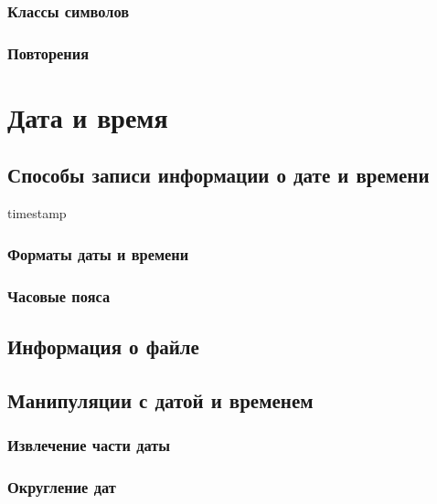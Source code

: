 \documentclass[
  letterpaper,
  DIV=11,
  numbers=noendperiod]{scrreprt}
\theoremstyle{definition}
\theoremstyle{remark}
\begin{document}
\subsection{Классы символов}\label{rstrings-regex-classes}

\subsection{Повторения}\label{rstrings-regex-repetition}


\chapter{Дата и время}\label{rdates}

\section{Способы записи информации о дате и
времени}\label{rdates-storing}

timestamp

\subsection{Форматы даты и времени}\label{rdates-formats}

\subsection{Часовые пояса}\label{rdates-timezone}

\section{Информация о файле}\label{rdates-fileinfo}

\section{Манипуляции с датой и временем}\label{rdates-manipulations}

\subsection{Извлечение части даты}\label{rdates-manipulations-extract}

\subsection{Округление дат}\label{rdates-manipulations-round}
\end{document}
